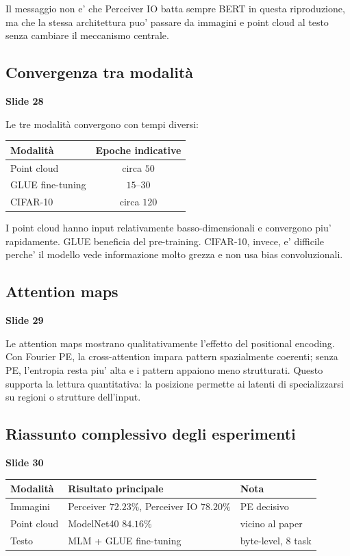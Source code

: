 \documentclass[11pt,a4paper]{article}
\newcommand{\slide}[1]{\textcolor{mainblue}{\textbf{Slide #1}}}
\begin{document}
Il messaggio non e' che Perceiver IO batta sempre BERT in questa riproduzione,
ma che la stessa architettura puo' passare da immagini e point cloud al testo
senza cambiare il meccanismo centrale.

\subsection{Convergenza tra modalit\`a}
\slide{28}

Le tre modalit\`a convergono con tempi diversi:
\begin{center}
\begin{tabular}{lc}
\toprule
\textbf{Modalit\`a} & \textbf{Epoche indicative} \\
\midrule
Point cloud & circa $50$ \\
GLUE fine-tuning & $15$--$30$ \\
CIFAR-10 & circa $120$ \\
\bottomrule
\end{tabular}
\end{center}

I point cloud hanno input relativamente basso-dimensionali e convergono piu'
rapidamente. GLUE beneficia del pre-training. CIFAR-10, invece, e' difficile
perche' il modello vede informazione molto grezza e non usa bias convoluzionali.

\subsection{Attention maps}
\slide{29}

Le attention maps mostrano qualitativamente l'effetto del positional encoding.
Con Fourier PE, la cross-attention impara pattern spazialmente coerenti; senza
PE, l'entropia resta piu' alta e i pattern appaiono meno strutturati. Questo
supporta la lettura quantitativa: la posizione permette ai latenti di
specializzarsi su regioni o strutture dell'input.

\subsection{Riassunto complessivo degli esperimenti}
\slide{30}

\begin{center}
\begin{tabularx}{\linewidth}{l X l}
\toprule
\textbf{Modalit\`a} & \textbf{Risultato principale} & \textbf{Nota} \\
\midrule
Immagini & Perceiver $72.23\%$, Perceiver IO $78.20\%$ & PE decisivo \\
Point cloud & ModelNet40 $84.16\%$ & vicino al paper \\
Testo & MLM + GLUE fine-tuning & byte-level, 8 task \\
\bottomrule
\end{tabularx}
\end{center}
\end{document}
